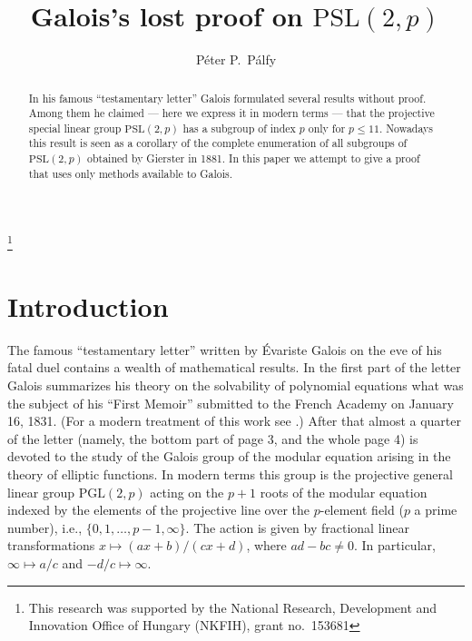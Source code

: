 \documentclass[reqno,12pt]{amsart}
\theoremstyle{definition}
\newcommand{\PSL}{\mathrm{PSL}}
\newcommand{\PGL}{\mathrm{PGL}}
\begin{document}
\title{Galois's lost proof on $\PSL(2,p)$}
\author{P\'eter P.~P\'alfy}
\address{Alfr\'ed R\'enyi Institute of Mathematics \\
Re\'altanoda utca 13--15, 1053 Budapest, Hungary}
\thanks{This research was supported by the National Research, Development and
Innovation Office of Hungary (NKFIH), grant no.~153681}

\begin{abstract}
In his famous ``testamentary letter'' Galois formulated several results without proof.
Among them he claimed --- here we express it in modern terms ---
that the projective special linear group $\PSL(2,p)$ has a subgroup of index $p$ only for $p\le 11$.
Nowadays this result is seen as a corollary of the complete enumeration of all subgroups
of $\PSL(2,p)$ obtained by Gierster in 1881.
In this paper we attempt to give a proof that uses only methods available to Galois.
\end{abstract}
\maketitle

\section{Introduction}

The famous ``testamentary letter'' written by \'Evariste Galois on the eve of his fatal
duel contains a wealth of mathematical results. In the first part of the letter Galois
summarizes his theory on the solvability of polynomial equations what was the subject of
his ``First Memoir'' submitted to the French Academy on January 16, 1831.
(For a modern treatment of this work see \cite{Edwards}.)
After that almost a quarter of the letter
(namely, the bottom part of page 3, and the whole page 4) is devoted to the study of
the Galois group of the modular equation arising in the theory of elliptic functions.
In modern terms this group is the projective general linear group $\PGL(2,p)$
acting on the $p+1$ roots of the modular equation indexed by the elements of the
projective line over the $p$-element field ($p$ a prime number), i.e., $\{0,1,\dots,p-1,\infty\}$.
The action is given by fractional linear transformations $x\mapsto (ax+b)/(cx+d)$, where
$ad-bc\ne 0$. In particular, $\infty\mapsto a/c$ and $-d/c\mapsto\infty$.
\end{document}
